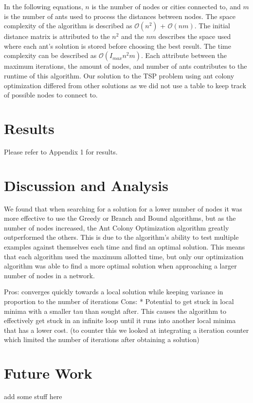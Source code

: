 In the following equations, $n$ is the number of nodes or cities connected to, and $m$ is the
number of ants used to process the distances between nodes. The space complexity of the algorithm 
is described as $\mathcal{O}(n^2)$ + $\mathcal{O}(nm)$. The initial distance matrix is attributed
to the $n^2$ and the $nm$ describes the space used where each ant's solution is stored before 
choosing the best result. The time complexity can be described as $\mathcal{O}(I_{max}n^2m)$. 
Each attribute between the maximum iterations, the amount of nodes, and number of ants contributes
to the runtime of this algorithm. Our solution to the TSP problem using ant colony optimization
differed from other solutions as we did not use a table to keep track of possible nodes to connect to.

\section{Results}
Please refer to Appendix 1 for results.

\section{Discussion and Analysis}
We found that when searching for a solution for a lower number of nodes it was more effective to
use the Greedy or Branch and Bound algorithms, but as the number of nodes increased, the Ant Colony
Optimization algorithm greatly outperformed the others. This is due to the algorithm's ability to
test multiple examples against themselves each time and find an optimal solution. This means that
each algorithm used the maximum allotted time, but only our optimization algorithm was able to find 
a more optimal solution when approaching a larger number of nodes in a network. 

Pros: converges quickly towards a local solution while keeping variance in proportion to the number of iterations
Cons: * Potential to get stuck in local minima with a smaller tau than sought after. This causes
the algorithm to effectively get stuck in an infinite loop until it runs into another local minima
that has a lower cost. (to counter this we looked at integrating a iteration counter which limited
the number of iterations after obtaining a solution)

\section{Future Work}
add some stuff here







